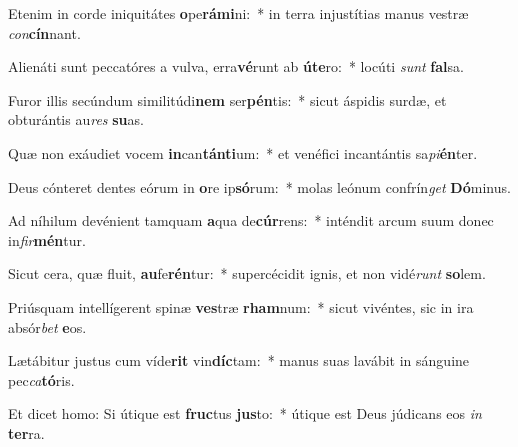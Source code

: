 \item Etenim in corde iniquitátes \textbf{o}pe\textbf{rá}\textbf{mi}ni:~* in terra injustítias manus vestræ \textit{con}\textbf{cín}nant.
\item Alienáti sunt peccatóres a vulva, erra\textbf{vé}runt ab \textbf{ú}\textbf{te}ro:~* locúti \textit{sunt} \textbf{fal}sa.
\item Furor illis secúndum similitúdi\textbf{nem} ser\textbf{pén}tis:~* sicut áspidis surdæ, et obturántis au\textit{res} \textbf{su}as.
\item Quæ non exáudiet vocem \textbf{in}can\textbf{tán}\textbf{ti}um:~* et venéfici incantántis sa\textit{pi}\textbf{én}ter.
\item Deus cónteret dentes eórum in \textbf{o}re ip\textbf{só}rum:~* molas leónum confrín\textit{get} \textbf{Dó}minus.
\item Ad níhilum devénient tamquam \textbf{a}qua de\textbf{cúr}rens:~* inténdit arcum suum donec in\textit{fir}\textbf{mén}tur.
\item Sicut cera, quæ fluit, \textbf{au}fe\textbf{rén}tur:~* supercécidit ignis, et non vidé\textit{runt} \textbf{so}lem.
\item Priúsquam intellígerent spinæ \textbf{ves}træ \textbf{rham}num:~* sicut vivéntes, sic in ira absór\textit{bet} \textbf{e}os.
\item Lætábitur justus cum víde\textbf{rit} vin\textbf{díc}tam:~* manus suas lavábit in sánguine pec\textit{ca}\textbf{tó}ris.
\item Et dicet homo: Si útique est \textbf{fruc}tus \textbf{jus}to:~* útique est Deus júdicans eos \textit{in} \textbf{ter}ra.
